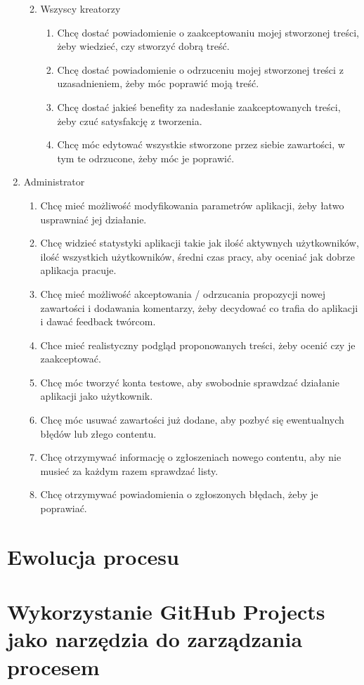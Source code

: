 \documentclass{article}
\begin{document}
\begin{tcolorbox}
\begin{enumerate}
\begin{enumerate}
\begin{enumerate}
                        \end{enumerate}
                  \item Wszyscy kreatorzy
                        \begin{enumerate}
                            \item Chcę dostać powiadomienie o zaakceptowaniu mojej stworzonej treści, żeby wiedzieć, czy stworzyć dobrą treść.
                            \item Chcę dostać powiadomienie o odrzuceniu mojej stworzonej treści z uzasadnieniem, żeby móc poprawić moją treść.
                            \item Chcę dostać jakieś benefity za nadesłanie zaakceptowanych treści, żeby czuć satysfakcję z tworzenia.
                            \item Chcę móc edytować wszystkie stworzone przez siebie zawartości, w tym te odrzucone, żeby móc je poprawić.
                        \end{enumerate}
              \end{enumerate}
        \item Administrator
              \begin{enumerate}
                  \item Chcę mieć możliwość modyfikowania parametrów aplikacji, żeby łatwo usprawniać jej działanie.
                  \item Chcę widzieć statystyki aplikacji takie jak ilość aktywnych użytkowników, ilość wszystkich użytkowników, średni czas pracy, aby oceniać jak dobrze aplikacja pracuje.
                  \item Chcę mieć możliwość akceptowania / odrzucania propozycji nowej zawartości i dodawania komentarzy, żeby decydować co trafia do aplikacji i dawać feedback twórcom.
                  \item Chce mieć realistyczny podgląd proponowanych treści, żeby ocenić czy je zaakceptować.
                  \item Chcę móc tworzyć konta testowe, aby swobodnie sprawdzać działanie aplikacji jako użytkownik.
                  \item Chcę móc usuwać zawartości już dodane, aby pozbyć się ewentualnych błędów lub złego contentu.
                  \item Chcę otrzymywać informację o zgłoszeniach nowego contentu, aby nie musieć za każdym razem sprawdzać listy.
                  \item Chcę otrzymywać powiadomienia o zgłoszonych błędach, żeby je poprawiać.
              \end{enumerate}
    \end{enumerate}
\end{tcolorbox}
\section{Ewolucja procesu}

\section{Wykorzystanie GitHub Projects jako narzędzia do zarządzania procesem}


\printbibliography
\end{document}
